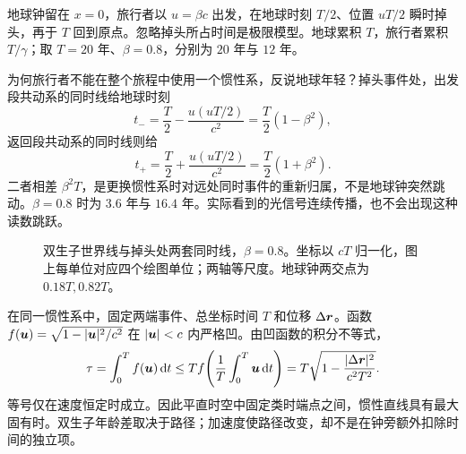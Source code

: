 \begin{example}[双生子的年龄和同时性切换]
地球钟留在 $x=0$，旅行者以 $u=\beta c$ 出发，在地球时刻 $T/2$、位置 $uT/2$ 瞬时掉头，再于 $T$ 回到原点。忽略掉头所占时间是极限模型。地球累积 $T$，旅行者累积 $T/\gamma$；取 $T=20$ 年、$\beta=0.8$，分别为 $20$ 年与 $12$ 年。

为何旅行者不能在整个旅程中使用一个惯性系，反说地球年轻？掉头事件处，出发段共动系的同时线给地球时刻
\[
t_-=\frac{T}{2}-\frac{u(uT/2)}{c^2}=\frac{T}{2}(1-\beta^2),
\]
返回段共动系的同时线则给
\[
t_+=\frac{T}{2}+\frac{u(uT/2)}{c^2}=\frac{T}{2}(1+\beta^2).
\]
二者相差 $\beta^2T$，是更换惯性系时对远处同时事件的重新归属，不是地球钟突然跳动。$\beta=0.8$ 时为 $3.6$ 年与 $16.4$ 年。实际看到的光信号连续传播，也不会出现这种读数跳跃。
\end{example}

\begin{figure}[htbp]\centering
{}
\caption{双生子世界线与掉头处两套同时线，$\beta=0.8$。坐标以 $cT$ 归一化，图上每单位对应四个绘图单位；两轴等尺度。地球钟两交点为 $0.18T,0.82T$。}\label{fig:sr-twins}
\end{figure}

\begin{mathbox}[title={数学注记：直线世界线使固有时最大}]
在同一惯性系中，固定两端事件、总坐标时间 $T$ 和位移 $\Delta\boldsymbol{r}$。函数 $f(\boldsymbol{u})=\sqrt{1-|\boldsymbol{u}|^2/c^2}$ 在 $|\boldsymbol{u}|<c$ 内严格凹。由凹函数的积分不等式，
\[
\tau=\int_0^T f(\boldsymbol{u})\,\mathrm{d} t
\le T f\!\left(\frac1T\int_0^T\boldsymbol{u}\,\mathrm{d} t\right)
=T\sqrt{1-\frac{|\Delta\boldsymbol{r}|^2}{c^2T^2}}.
\]
等号仅在速度恒定时成立。因此平直时空中固定类时端点之间，惯性直线具有最大固有时。双生子年龄差取决于路径；加速度使路径改变，却不是在钟旁额外扣除时间的独立项。
\end{mathbox}

